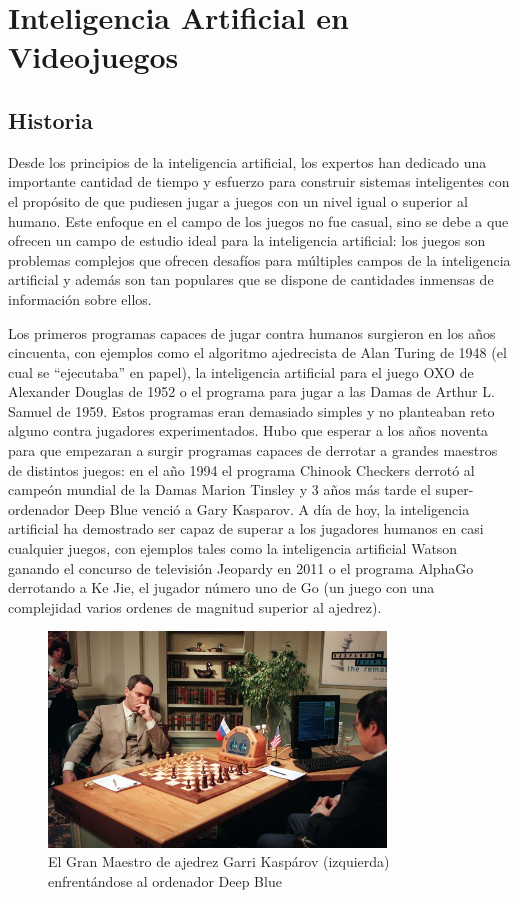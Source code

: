 \section{Inteligencia Artificial en Videojuegos}
\subsection{Historia}
Desde los principios de la inteligencia artificial, los expertos han dedicado una importante cantidad de tiempo y esfuerzo para construir sistemas inteligentes con el propósito de que pudiesen jugar a juegos con un nivel igual o superior al humano. Este enfoque en el campo de los juegos no fue casual, sino se debe a que ofrecen un campo de estudio ideal para la inteligencia artificial: los juegos son problemas complejos que ofrecen desafíos para múltiples campos de la inteligencia artificial y además son tan populares que se dispone de cantidades inmensas de información sobre ellos\cite{ai_and_games}.

Los primeros programas capaces de jugar contra humanos surgieron en los años cincuenta, con ejemplos como el algoritmo ajedrecista de Alan Turing de 1948 (el cual se ``ejecutaba'' en papel), la inteligencia artificial para el juego OXO de Alexander Douglas de 1952 o el programa para jugar a las Damas de Arthur L. Samuel de 1959. Estos programas eran demasiado simples y no planteaban reto alguno contra jugadores experimentados. Hubo que esperar a los años noventa para que empezaran a surgir programas capaces de derrotar a grandes maestros de distintos juegos: en el año 1994 el programa Chinook Checkers derrotó al campeón mundial de la Damas Marion Tinsley y 3 años más tarde el super-ordenador Deep Blue venció a Gary Kasparov. A día de hoy, la inteligencia artificial ha demostrado ser capaz de superar a los jugadores humanos en casi cualquier juegos, con ejemplos tales como la inteligencia artificial Watson ganando el concurso de televisión Jeopardy en 2011 o el programa AlphaGo derrotando a Ke Jie, el jugador número uno de Go (un juego con una complejidad varios ordenes de magnitud superior al ajedrez).

\begin{figure}[h]
	\includegraphics[width=0.8\textwidth]{images/estadodelarte/ai/deepblue-vs-kasparov}
	\centering
	\caption{El Gran Maestro de ajedrez Garri Kaspárov (izquierda) enfrentándose al ordenador Deep Blue}
\end{figure}

